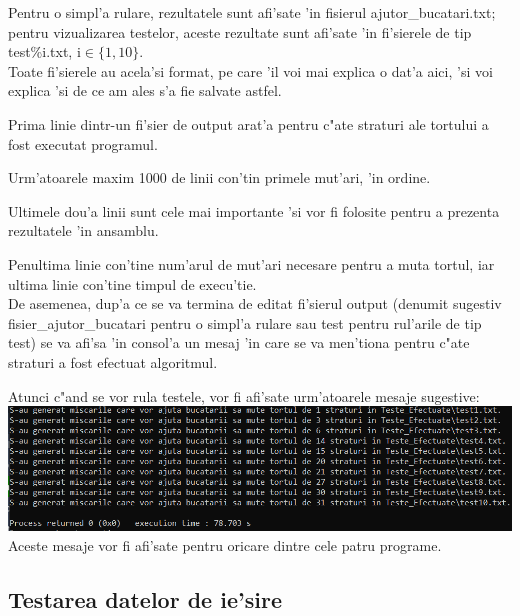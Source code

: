 \documentclass{article}
\begin{document}
Pentru o simpl'a rulare, rezultatele sunt afi'sate 'in fisierul ajutor\_bucatari.txt; pentru vizualizarea testelor, aceste rezultate sunt afi'sate 'in fi'sierele de tip test\%i.txt, i$\in\{1,10\}$.\\

Toate fi'sierele au acela'si format, pe care 'il voi mai explica o dat'a aici, 'si voi explica 'si de ce am ales s'a fie salvate astfel.

Prima linie dintr-un fi'sier de output arat'a pentru c"ate straturi ale tortului a fost executat programul.

Urm'atoarele maxim 1000 de linii con'tin primele mut'ari, 'in ordine.

Ultimele dou'a linii sunt cele mai importante 'si vor fi folosite pentru a prezenta rezultatele 'in ansamblu.

Penultima linie con'tine num'arul de mut'ari necesare pentru a muta tortul, iar ultima linie con'tine timpul de execu'tie.\\

De asemenea, dup'a ce se va termina de editat fi'sierul output (denumit sugestiv fisier\_ajutor\_bucatari pentru o simpl'a rulare sau test pentru rul'arile de tip test) se va afi'sa 'in consol'a un mesaj 'in care se va men'tiona pentru c"ate straturi a fost efectuat algoritmul.

Atunci c"and se vor rula testele, vor fi afi'sate urm'atoarele mesaje sugestive:
\includegraphics[scale=0.6]{Exemplu_Rulare_Teste}\\

Aceste mesaje vor fi afi'sate pentru oricare dintre cele patru programe.

\newpage

\subsection{Testarea datelor de ie'sire}
\end{document}
